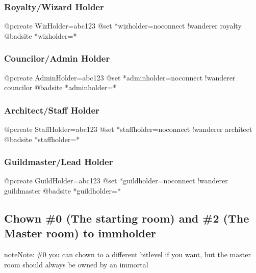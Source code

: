\documentclass[letterpaper,10pt,english]{sphinxmanual}
\begin{document}
\subsubsection{Royalty/Wizard Holder}
\label{\detokenize{gettingstarted:royalty-wizard-holder}}
\begin{sphinxVerbatim}[commandchars=\\\{\}]
@pcreate WizHolder=abc123
@set *wizholder=no\PYGZus{}connect !wanderer royalty
@badsite *wizholder=*
\end{sphinxVerbatim}


\subsubsection{Councilor/Admin Holder}
\label{\detokenize{gettingstarted:councilor-admin-holder}}
\begin{sphinxVerbatim}[commandchars=\\\{\}]
@pcreate AdminHolder=abc123
@set *adminholder=no\PYGZus{}connect !wanderer councilor
@badsite *adminholder=*
\end{sphinxVerbatim}


\subsubsection{Architect/Staff Holder}
\label{\detokenize{gettingstarted:architect-staff-holder}}
\begin{sphinxVerbatim}[commandchars=\\\{\}]
@pcreate StaffHolder=abc123
@set *staffholder=no\PYGZus{}connect !wanderer architect
@badsite *staffholder=*
\end{sphinxVerbatim}


\subsubsection{Guildmaster/Lead Holder}
\label{\detokenize{gettingstarted:guildmaster-lead-holder}}
\begin{sphinxVerbatim}[commandchars=\\\{\}]
@pcreate GuildHolder=abc123
@set *guildholder=no\PYGZus{}connect !wanderer guildmaster
@badsite *guildholder=*
\end{sphinxVerbatim}


\subsection{Chown \#0 (The starting room) and \#2 (The Master room) to immholder}
\label{\detokenize{gettingstarted:chown-0-the-starting-room-and-2-the-master-room-to-immholder}}
\begin{sphinxadmonition}{note}{Note:}
\sphinxAtStartPar
\#0 you can chown to a different bitlevel if you want, but the master room should always be owned by an immortal
\end{sphinxadmonition}
\end{document}
